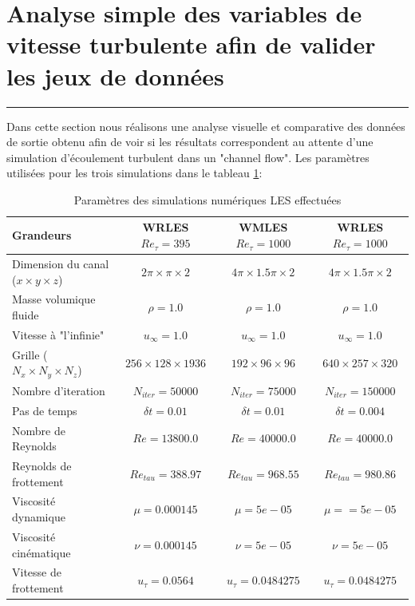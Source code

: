 \documentclass[12pt]{article}
\theoremstyle{plain}
\theoremstyle{remark}
\begin{document}
\vspace{0.3cm}
\section{Analyse simple des variables de vitesse turbulente afin de valider les jeux de données}
\noindent\rule{\linewidth}{2pt}
\vspace{0.1cm}

Dans cette section nous réalisons une analyse visuelle et comparative des données de sortie obtenu afin de voir si les résultats correspondent au attente d'une simulation d'écoulement turbulent dans un "channel flow". Les paramètres utilisées pour les trois simulations dans le tableau \ref{tab:parameters}: \\

\begin{table}[!h]
	\begin{tabular}{l | c | c | c}

		Grandeurs & WRLES $Re_{\tau}=395$ & WMLES $Re_{\tau}=1000$ & WRLES $Re_{\tau}=1000$\\ \hline \hline
		Dimension du canal ($x\times y \times z$) &  $2\pi\times\pi\times2$ & $4\pi\times1.5\pi\times2$ & $4\pi\times1.5\pi\times2$\\
		Masse volumique fluide &  $\rho = 1.0$ & $\rho = 1.0$ & $\rho = 1.0$ \\
		Vitesse à "l'infinie" & $u_{\infty}=1.0$ & $u_{\infty}=1.0$ & $u_{\infty}=1.0$  \\
		Grille ($N_x\times N_y \times N_z$) & $256\times128\times1936$ & $192\times96\times96$ & $640\times257\times320$ \\
		Nombre d'iteration & $N_{iter}=50000$ & $N_{iter}=75000$ & $N_{iter}=150000$ \\
		Pas de temps & $\delta t=0.01$ & $\delta t=0.01$ & $\delta t=0.004$ \\
		Nombre de Reynolds & $Re = 13800.0$ & $Re = 40000.0$ & $Re = 40000.0$ \\
		Reynolds de frottement & $Re_{tau} = 388.97$ & $Re_{tau} = 968.55$ & $Re_{tau} = 980.86$ \\
		Viscosité dynamique& $\mu = 0.000145$ & $\mu = 5e-05$ & $\mu = = 5e-05$ \\
		Viscosité cinématique & $\nu = 0.000145$ & $\nu = 5e-05$ & $\nu = 5e-05$ \\
		Vitesse de frottement & $u_{\tau} = 0.0564$ & $u_{\tau} = 0.0484275$ & $u_{\tau} = 0.0484275$ \\
		\hline
	\end{tabular}
	\caption{Paramètres des simulations numériques LES effectuées}
	\label{tab:parameters}
\end{table}
\end{document}
